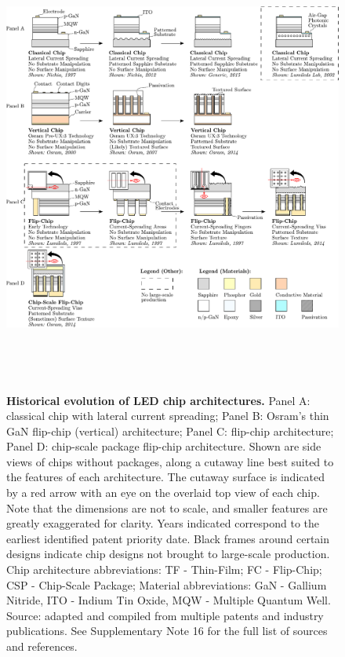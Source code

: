 \documentclass[parskip=full]{article}
\begin{document}
\clearpage
\begin{figure}[h!]
\centering
\includegraphics[height=15cm]{figures/chip_architecture_overview.pdf}
\caption{\textbf{Historical evolution of LED chip architectures.} Panel A: classical chip with lateral current spreading; Panel B: Osram’s thin GaN flip-chip (vertical) architecture; Panel C: flip-chip architecture; Panel D: chip-scale package flip-chip architecture. Shown are side views of chips without packages, along a cutaway line best suited to the features of each architecture. The cutaway surface is indicated by a red arrow with an eye on the overlaid top view of each chip. Note that the dimensions are not to scale, and smaller features are greatly exaggerated for clarity. Years indicated correspond to the earliest identified patent priority date. Black frames around certain designs indicate chip designs not brought to large-scale production. Chip architecture abbreviations: TF - Thin-Film; FC - Flip-Chip; CSP - Chip-Scale Package; Material abbreviations: GaN - Gallium Nitride, ITO - Indium Tin Oxide, MQW - Multiple Quantum Well. Source: adapted and compiled from multiple patents and industry publications. See Supplementary Note 16 for the full list of sources and references.}
\label{fgr:chip_architecture_overview}
\end{figure}
\end{document}
